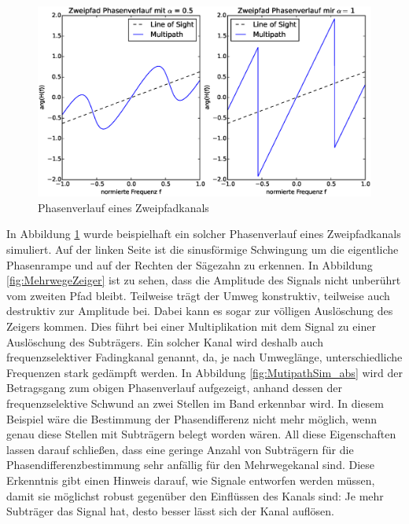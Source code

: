 \begin{figure}[htbp]
	\centering
	\includegraphics[width=\textwidth]{images/MutipathSim}
	\caption{Phasenverlauf eines Zweipfadkanals}
	\label{fig:MutipathSim}
\end{figure}

In Abbildung \ref{fig:MutipathSim} wurde beispielhaft ein solcher Phasenverlauf eines Zweipfadkanals simuliert. Auf der linken Seite ist die sinusförmige Schwingung um die eigentliche Phasenrampe und auf der Rechten der Sägezahn zu erkennen.
In Abbildung \ref{fig:MehrwegeZeiger} ist zu sehen, dass die Amplitude des Signals nicht unberührt vom zweiten Pfad bleibt. Teilweise trägt der Umweg konstruktiv, teilweise auch destruktiv zur Amplitude bei. Dabei kann es sogar zur völligen Auslöschung des Zeigers kommen. Dies führt bei einer Multiplikation mit dem Signal zu einer Auslöschung des Subträgers. Ein solcher Kanal wird deshalb auch frequenzselektiver Fadingkanal genannt, da, je nach Umweglänge, unterschiedliche Frequenzen stark gedämpft werden. In Abbildung \ref{fig:MutipathSim_abs} wird der Betragsgang zum obigen Phasenverlauf aufgezeigt, anhand dessen der frequenzselektive Schwund an zwei Stellen im Band erkennbar wird. In diesem Beispiel wäre die Bestimmung der Phasendifferenz nicht mehr möglich, wenn genau diese Stellen mit Subträgern belegt worden wären. All diese Eigenschaften lassen darauf schließen, dass eine geringe Anzahl von Subträgern für die Phasendifferenzbestimmung sehr anfällig für den Mehrwegekanal sind. Diese Erkenntnis gibt einen Hinweis darauf, wie Signale entworfen werden müssen, damit sie möglichst robust gegenüber den Einflüssen des Kanals sind: Je mehr Subträger das Signal hat, desto besser lässt sich der Kanal auflösen. 

